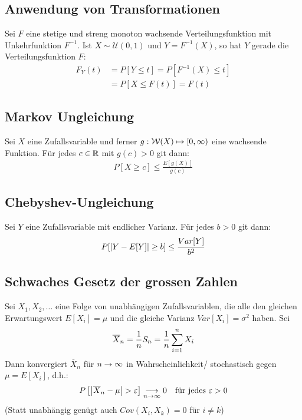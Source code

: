 \subsection*{Anwendung von Transformationen}
Sei $F$ eine stetige und streng monoton wachsende Verteilungsfunktion mit
Unkehrfunktion $F^{-1}$. Ist $X \sim \mathcal{U} (0, 1)$ und $Y = F^{-1} (X)$,
so hat $Y$ gerade die Verteilungsfunktion $F$:
\begin{align*}
  F_Y (t) & = P[Y \leq t] = P[F^{-1} (X) \leq t] \\
          & = P[X \leq F (t)] = F (t)
\end{align*}
\subsection*{Markov Ungleichung}
Sei $X$ eine Zufallsvariable und ferner $g : \mathcal{W} (X) \mapsto [0, \infty)$ eine
wachsende Funktion. Für jedes $c \in \mathbb{R}$ mit $g (c) > 0$ git dann:
\begin{align*}
  P[X \geq c] \leq \frac{E[g (X)]}{g (c)}
\end{align*}
\subsection*{Chebyshev-Ungleichung}
Sei $Y$ eine Zufallsvariable mit endlicher Varianz. Für jedes $b > 0$ git dann:
\begin{align*}
  P[\abs{Y - E[Y]} \geq b] \leq \frac{Var[Y]}{b^2}
\end{align*}
\subsection*{Schwaches Gesetz der grossen Zahlen}
Sei $X_1, X_2, \dots$ eine Folge von unabhängigen Zufallsvariablen, die alle
den gleichen Erwartungswert $E[X_i] = \mu$ und die gleiche Varianz $Var[X_i] =
  \sigma^2$ haben. Sei
\begin{align*}
  \overline{X}_n = \frac{1}{n} S_n = \frac{1}{n} \sum_{i = 1}^n X_i
\end{align*}
Dann konvergiert $\overline{X}_n$ für $n \rightarrow \infty$ in Wahrscheinlichkeit/
stochastisch gegen $\mu = E[X_i]$, d.h.:
\begin{align*}
  P \left[ \abs{\overline{X}_n - \mu} > \varepsilon \right] \underset{n \rightarrow \infty}{\longrightarrow} 0
   &  & \text{für jedes } \varepsilon > 0
\end{align*}
(Statt unabhängig genügt auch $Cov (X_i, X_k) = 0$ für $i \neq k$)
